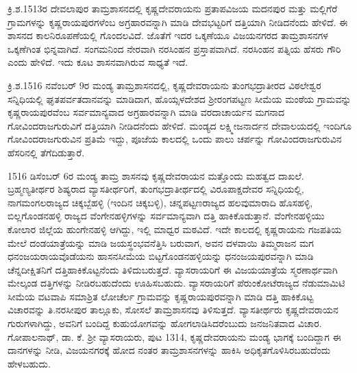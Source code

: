 ಕ್ರಿ.ಶ.1513ರ ದೇವಲಾಪುರ ತಾಮ್ರಶಾಸನದಲ್ಲಿ ಕೃಷ್ಣದೇವರಾಯನು ಪ್ರತಾಪವಿಜಯ ಮದನಪುರ ಮತ್ತು ಮಲ್ಲಿಗೆರೆ ಗ್ರಾಮಗಳನ್ನು ಕೃಷ್ಣರಾಯಪುರಗಳೆಂಬ ಅಗ್ರಹಾರವನ್ನಾಗಿ ಮಾಡಿ ದೇವಭಟ್ಟರಿಗೆ ದತ್ತಿಯಾಗಿ ನೀಡಿದನೆಂದು ಹೇಳಿದೆ. ಈ ಶಾಸನದ ಕಾಲನಿರೂಪಣೆಯಲ್ಲಿ ಗೊಂದಲವಿದೆ. ಜೊತೆಗೆ ಇದರ ಒಕ್ಕಣೆಯೂ ವಿಜಯನಗರದ ತಾಮ್ರಶಾಸನಗಳ ಒಕ್ಕಣೆಗಿಂತ ಭಿನ್ನವಾಗಿದೆ. ಸಂಗಮನಿಂದ ನೇರವಾಗಿ ನರಸಿಂಹನ ಪ್ರಸ್ತಾಪವಾಗಿದೆ. ನರಸಿಂಹನ ಪತ್ನಿಯ ಹೆಸರು ಗೌರಿ ಎಂದು ಹೇಳಿದೆ. ಇದು ಕೂಟ ಶಾಸನವಾಗಿರುವ ಸಾಧ್ಯತೆ ಇದೆ.

ಕ್ರಿ.ಶ.1516 ನವೆಂಬರ್​ 9ರ ಮಂಡ್ಯ ತಾಮ್ರಶಾಸನದಲ್ಲಿ, ಕೃಷ್ಣದೇವರಾಯನು ತುಂಗಭದ್ರಾತೀರದ ವಿಠಲೇಶ್ವರ ಸನ್ನಿಧಿಯಲ್ಲಿ ಘೃತಪರ್ವತದಾನವನ್ನು ಮಾಡಿದಾಗ, ಹೊಯ್ಸಳದೇಶದ ಶ‍್ರೀರಂಗಪಟ್ಟಣ ಸೀಮೆಯ ಮಂಠೆಯ ಗ್ರಾಮವನ್ನು ಕೃಷ್ಣರಾಯಪುರವೆಂಬ ಸರ್ವಮಾನ್ಯವಾದ ಅಗ್ರಹಾರವನ್ನಾಗಿ ಮಾಡಿ ವರದಾಚಾರ್ಯನ ಮಗನಾದ ಗೋವಿಂದರಾಜಗುರುವಿಗೆ ದತ್ತಿಯಾಗಿ ನೀಡಿದನೆಂದು ಹೇಳಿದೆ. ಮಂಡ್ಯದ ಲಕ್ಷ್ಮೀಜನಾರ್ದನ ದೇವಾಲಯದಲ್ಲಿ ಇಂದಿಗೂ ಗೋವಿಂದರಾಜಗುರುವಿನ ಪ್ರತಿಮೆ ಇದ್ದು, ಪೂಜೆಯ ಕಾಲದಲ್ಲಿ ಒಂದು ಪಾಲು ಚರ್ಪನ್ನು ಗೋವಿಂದರಾಜಗುರುವಿನ ಹೆಸರಿನಲ್ಲಿ ತೆಗೆದಿಡುತ್ತಾರೆ.

1516 ಡಿಸೆಂಬರ್​ 6ರ ಮಂಡ್ಯ ತಾಮ್ರ ಶಾಸನವು ಕೃಷ್ಣದೇವರಾಯನ ಮತ್ತೊಂದು ಮಹತ್ವದ ದಾಖಲೆ. ಬ್ರಹ್ಮಣ್ಯತೀರ್ಥರ ಶಿಷ್ಯರಾದ ವ್ಯಾಸತೀರ್ಥರಿಗೆ, ತುಂಗಭದ್ರಾತೀರ್ಥದಲ್ಲಿ ವಿರೂಪಾಕ್ಷದೇವರ ಸನ್ನಿಧಿಯಲ್ಲಿ, ನಾಗಮಂಗಲರಾಜ್ಯದ ಚಿಕ್ಕಬ್ಬೆಹಳ್ಳಿ (ಇಂದಿನ ಚಿಕ್ಕಬಳ್ಳಿ), ಚನ್ನಪಟ್ಟಣರಾಜ್ಯದ ಹಲವುಮಾರಾದಿ ಹೊಸಹಳ್ಳಿ, ಬಿಲ್ಲಗೊಂಡನಹಳ್ಳಿ ರಾಜ್ಯದ ವೆಂಗೇನಹಳ್ಳಿಗಳನ್ನು ಸರ್ವಮಾನ್ಯವಾಗಿ ದತ್ತಿ ಹಾಕಿಕೊಡುತ್ತಾನೆ. ವೆಂಗೇನಹಳ್ಳಿಯು ಕೋಲಾರ ಜಿಲ್ಲೆಯ ಹುಂಗೇನಹಳ್ಳಿ ಆಗಿದ್ದು, ಇಲ್ಲಿ ಮಾಧ್ವರ ಮಠವಿದೆ. ಇದೇ ಕಾಲದಲ್ಲಿ ಕೃಷ್ಣರಾಯನು ಗಜಪತಿಯ ಮೇಲೆ ದಂಡಯಾತ್ರೆಯನ್ನು ಮಾಡಿ ಜಯಸ್ಥಂಭವನೆತ್ತಿಸಿ ಬರುವಾಗ, ಅವನ ದಳವಾಯಿ ತಿಮ್ಮರಾಜನ ಮಗ ಧನಂಜಯರಾಯವೊಡೆಯನು ಹಾಸನಸೀಮೆಯ ಬಿಟ್ಟಗೊಂಡನಹಳ್ಳಿಯನ್ನು ಧನಂಜಯಪುರವನ್ನಾಗಿ ಮಾಡಿ ಚೆನ್ನದೀಕ್ಷಿತನಿಗೆ ದತ್ತಿಹಾಕಿಕೊಟ್ಟನೆಂದು ತಿಳಿದುಬರುತ್ತದೆ. ವ್ಯಾಸರಾಯರಿಗೆ ಈ ವಿಜಯಯಾತ್ರೆಯ ಸ್ಮರಣಾರ್ಥವಾಗಿ ಮೇಲ್ಕಂಡ ದತ್ತಿಗಳನ್ನು ನೀಡಿರಬಹುದೆಂದು ಊಹಿಸಬಹುದು. ವ್ಯಾಸರಾಯರಿಗೆ ಪೆರುಂಕೋಟೆರಾಜ್ಯದ ನೆಡುಮಾಮಿಟಿ ಸೀಮೆಯ ವಟವಾಪಿ ಸಮಾಶ್ರಿತ ಲೋಚೆರ್ಲ ಗ್ರಾಮವನ್ನು ಕೃಷ್ಣರಾಯಪುರವನ್ನಾಗಿ ಮಾಡಿ ದತ್ತಿ ಹಾಕಿಕೊಟ್ಟ ವಿಚಾರವನ್ನು ತಿ.ನರಸೀಪುರ ತಾಲ್ಲೂಕು, ಸೋಸಲೆ ತಾಮ್ರಶಾಸನವು ತಿಳಿಸುತ್ತದೆ. ವ್ಯಾಸತೀರ್ಥರು ಕೃಷ್ಣದೇವರಾಯನ ಗುರುಗಳಾಗಿದ್ದು, ಅವನಿಗೆ ಬಂದಿದ್ದ ಕುಹುಯೋಗವನ್ನು ಹೋಗಲಾಡಿಸಿದರೆಂಬುದು ಜನಜನಿತವಾದ ವಿಚಾರ. ಗೋಪಾಲನಾಥ್, ಡಾ. ಕೆ. ಶ‍್ರೀ ವ್ಯಾಸರಾಯರು, ಪುಟ 1314, ಕೃಷ್ಣದೇವರಾಯನು ಮಂಡ್ಯ ಭಾಗಕ್ಕೆ ಬಂದಿದ್ದಾಗ ಈ ದಾನಗಳನ್ನು ನೀಡಿ, ವಿಜಯನಗರಕ್ಕೆ ಹೋದ ನಂತರ ತಾಮ್ರಶಾಸನಗಳನ್ನು ಹಾಕಿಸಿ ಅಧಿಕೃತಗೊಳಿಸಿರ\-ಬಹುದೆಂದು ಹೇಳಬಹುದು.

